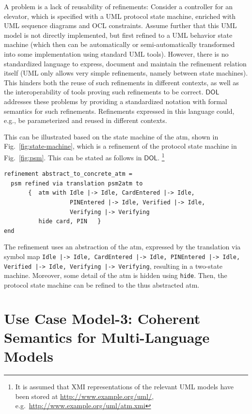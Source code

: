 \documentclass[10pt,fleqn,final]{scrreprt}
\newcommand*{\syntax}[1]{\texttt{#1}}
\newcommand*{\DOL}{\ensuremath{\mathsf{DOL}}\xspace}
\newenvironment{definitions}[0]{\medskip }{}
\newcommand{\uml}[1]{\textsf{#1}}
\begin{document}
\begin{definitions}
A problem is a lack of reusability of refinements: Consider a controller for an elevator, which is specified with a UML protocol state machine, enriched with UML 
sequence diagrams and OCL constraints. Assume further that this UML model is not directly implemented, but first refined to a UML behavior state machine (which then 
can be automatically or semi-automatically transformed into some implementation using standard UML tools). However, there is no standardized language to 
express, document and maintain the refinement relation itself (UML only allows very simple refinements, namely between state machines). This hinders both the 
reuse of such refinements in different contexts, as well as the interoperability of tools proving such refinements to be correct. \DOL  
addresses these problems by providing a standardized notation with formal semantics for such refinements. Refinements expressed in this language could, e.g., be 
parameterized and reused in different contexts.

 This can be illustrated based on the state
machine of the \uml{atm}, shown in Fig.~\ref{fig:state-machine}, which is a  
refinement of the protocol state machine in Fig.~\ref{fig:psm}. This can be stated as follows in \DOL. 
\footnote{  It is assumed that XMI representations of the relevant UML models have been 
stored at \url{http://www.example.org/uml/},
e.g.\ \url{http://www.example.org/uml/atm.xmi} } 


\begin{lstlisting}[basicstyle=\ttfamily,language=dolText,escapechar=@,mathescape]
refinement abstract_to_concrete_atm =
  psm refined via translation psm2atm to 
       {  atm with Idle |-> Idle, CardEntered |-> Idle, 
                   PINEntered |-> Idle, Verified |-> Idle, 
                   Verifying |-> Verifying 
          hide card, PIN   }
end
\end{lstlisting}

The refinement uses an abstraction of the \uml{atm}, expressed by the
translation via symbol map \texttt{Idle |-> Idle, CardEntered |-> Idle, PINEntered |-> Idle, Verified |-> Idle, Verifying |-> Verifying}, resulting in a two-state machine. Moreover, some detail of the \uml{atm} is hidden using
\syntax{hide}. Then, the protocol state machine can be refined to
the thus abstracted \uml{atm}.

\section{Use Case Model-3: Coherent Semantics for Multi-Language Models}
\label{model-3}
	

\end{definitions}
\end{document}
